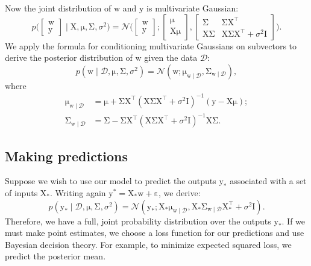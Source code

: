 \documentclass{article}
\newcommand{\given}{\mid}
\newcommand{\mc}[1]{\mathcal{#1}}
\newcommand{\data}{\mc{D}}
\newcommand{\inv}{^{-1}}
\newcommand{\trans}{^\top}
\newcommand{\mat}[1]{\bm{\mathrm{#1}}}
\renewcommand{\vec}[1]{\bm{\mathrm{#1}}}
\renewcommand{\epsilon}{\varepsilon}
\begin{document}
Now the joint distribution of $\vec{w}$ and $\vec{y}$ is multivariate
Gaussian:
\begin{equation*}
  p\Biggl(
  \begin{bmatrix}
    \vec{w}
    \\
    \vec{y}
  \end{bmatrix}
  \given
  \vec{X}, \vec{\mu}, \mat{\Sigma}, \sigma^2
  \Biggr)
  =
  \mc{N}
  \Biggl(
  \begin{bmatrix}
    \vec{w}
    \\
    \vec{y}
  \end{bmatrix}
  ;
  \begin{bmatrix}
    \vec{\mu}
    \\
    \mat{X}\vec{\mu}
  \end{bmatrix}
  ,
  \begin{bmatrix}
    \mat{\Sigma} & \mat{\Sigma}\mat{X}\trans
    \\
    \mat{X}\mat{\Sigma} & \mat{X}\mat{\Sigma}\mat{X}\trans + \sigma^2\mat{I}
  \end{bmatrix}
  \Biggr).
\end{equation*}
We apply the formula for conditioning multivariate Gaussians on
subvectors to derive the posterior distribution of $\vec{w}$ given
the data $\data$:
\begin{equation*}
  p(\vec{w} \given \data, \vec{\mu}, \mat{\Sigma}, \sigma^2)
  =
  \mc{N}(\vec{w};
  \vec{\mu}_{\vec{w}\given\data},
  \mat{\Sigma}_{\vec{w}\given\data}
  ),
\end{equation*}
where
\begin{align*}
  \vec{\mu}_{\vec{w}\given\data}
  &=
  \vec{\mu}
  +
  \mat{\Sigma}
  \mat{X}\trans
  (\mat{X}\mat{\Sigma}\mat{X}\trans + \sigma^2 \mat{I})\inv
  (\vec{y} - \mat{X}\vec{\mu});
  \\
  \mat{\Sigma}_{\vec{w}\given\data}
  &=
  \mat{\Sigma}
  -
  \mat{\Sigma}
  \mat{X}\trans
  (\mat{X}\mat{\Sigma}\mat{X}\trans + \sigma^2 \mat{I})\inv
  \mat{X}
  \mat{\Sigma}.
\end{align*}

\subsection*{Making predictions}

Suppose we wish to use our model to predict the outputs $\vec{y}_\ast$
associated with a set of inputs $\mat{X}_\ast$.  Writing again
$\vec{y}^\ast = \mat{X}_\ast\vec{w} + \vec{\epsilon}$, we derive:
\begin{equation*}
  p(\vec{y}_\ast \given \data, \vec{\mu}, \mat{\Sigma}, \sigma^2)
  =
  \mc{N}(
  \vec{y}_\ast;
  \mat{X}_\ast \vec{\mu}_{\vec{w}\given\data},
  \mat{X}_\ast \mat{\Sigma}_{\vec{w}\given\data} \mat{X}_\ast\trans + \sigma^2 \mat{I}).
\end{equation*}
Therefore, we have a full, joint probability distribution over the
outputs $\vec{y}_\ast$.  If we must make point estimates, we choose a
loss function for our predictions and use Bayesian decision theory.
For example, to minimize expected squared loss, we predict the
posterior mean.
\end{document}
